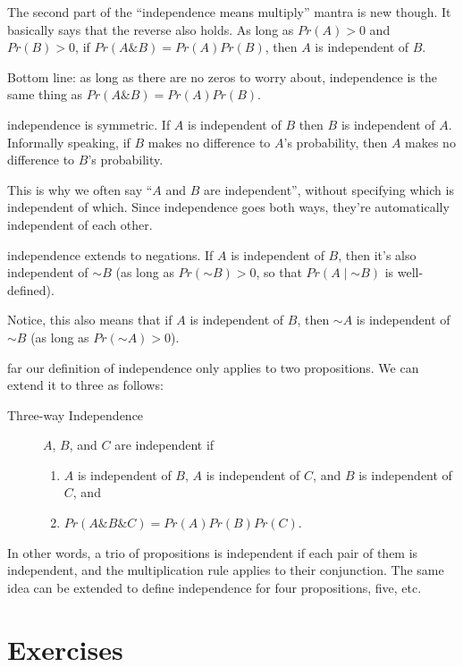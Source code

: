 \documentclass[justified]{tufte-book}
\providecommand{\tightlist}{%
  \setlength{\itemsep}{0pt}\setlength{\parskip}{0pt}}
\newcommand{\given}{\mid}
\renewcommand{\neg}{\mathbin{\sim}}
\renewcommand{\wedge}{\mathbin{\&}}
\newcommand{\p}{Pr}
\theoremstyle{definition}
\theoremstyle{definition}
\theoremstyle{definition}
\theoremstyle{remark}
\begin{document}
The second part of the ``independence means multiply'' mantra is new though. It basically says that the reverse also holds. As long as \(\p(A) > 0\) and \(\p(B) > 0\), if \(\p(A \wedge B) = \p(A)\p(B)\), then \(A\) is independent of \(B\).

Bottom line: as long as there are no zeros to worry about, independence is the same thing as \(\p(A \wedge B) = \p(A)\p(B)\).

 independence is symmetric. If \(A\) is independent of \(B\) then \(B\) is independent of \(A\). Informally speaking, if \(B\) makes no difference to \(A\)'s probability, then \(A\) makes no difference to \(B\)'s probability.

This is why we often say ``\(A\) and \(B\) are independent'', without specifying which is independent of which. Since independence goes both ways, they're automatically independent of each other.

 independence extends to negations. If \(A\) is independent of \(B\), then it's also independent of \(\neg B\) (as long as \(\p(\neg B) > 0\), so that \(\p(A \given \neg B)\) is well-defined).

Notice, this also means that if \(A\) is independent of \(B\), then \(\neg A\) is independent of \(\neg B\) (as long as \(\p(\neg A) > 0\)).

 far our definition of independence only applies to two propositions. We can extend it to three as follows:

\begin{description}
\item[Three-way Independence]
\(A\), \(B\), and \(C\) are independent if

\begin{enumerate}
\def\labelenumi{\roman{enumi}.}
\tightlist
\item
  \(A\) is independent of \(B\), \(A\) is independent of \(C\), and \(B\) is independent of \(C\), and
\item
  \(\p(A \wedge B \wedge C) = \p(A)\p(B)\p(C)\).
\end{enumerate}
\end{description}

In other words, a trio of propositions is independent if each pair of them is independent, and the multiplication rule applies to their conjunction. The same idea can be extended to define independence for four propositions, five, etc.

\hypertarget{ch6ex}{%
\section*{Exercises}\label{ch6ex}}
\end{document}
